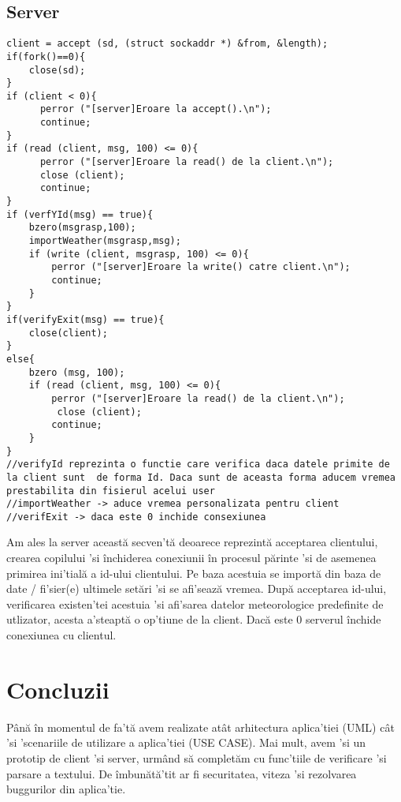 \documentclass{llncs}
\begin{document}
\subsection{Server}
%
\begin{lstlisting}
client = accept (sd, (struct sockaddr *) &from, &length);
if(fork()==0){
	close(sd);
}
if (client < 0){
	  perror ("[server]Eroare la accept().\n");
	  continue;
}
if (read (client, msg, 100) <= 0){
	  perror ("[server]Eroare la read() de la client.\n");
	  close (client);	
	  continue;		
}
if (verfYId(msg) == true){
	bzero(msgrasp,100);
	importWeather(msgrasp,msg);
	if (write (client, msgrasp, 100) <= 0){
	 	perror ("[server]Eroare la write() catre client.\n");
	  	continue;		
	}
}
if(verifyExit(msg) == true){
	close(client);
}
else{
	bzero (msg, 100);
	if (read (client, msg, 100) <= 0){
	  	perror ("[server]Eroare la read() de la client.\n");
	 	 close (client);	
	  	continue;		
	}
}
//verifyId reprezinta o functie care verifica daca datele primite de la client sunt  de forma Id. Daca sunt de aceasta forma aducem vremea prestabilita din fisierul acelui user
//importWeather -> aduce vremea personalizata pentru client
//verifExit -> daca este 0 inchide consexiunea
\end{lstlisting}
%
Am ales la server această secven'tă deoarece reprezintă acceptarea clientului, crearea copilului 'si închiderea conexiunii în procesul părinte 'si de asemenea
primirea ini'tială a id-ului clientului. Pe baza acestuia se importă din baza de date / fi'sier(e) ultimele setări 'si se afi'sează vremea. După acceptarea id-ului, verificarea existen'tei
acestuia 'si afi'sarea datelor meteorologice predefinite de utlizator, acesta a'steaptă o op'tiune de la client. Dacă este 0 serverul închide conexiunea cu clientul.
%
\section{Concluzii}
%
Până în momentul de fa'tă avem realizate atât arhitectura aplica'tiei (UML) cât 'si 'scenariile de utilizare a aplica'tiei (USE CASE). Mai mult, avem 'si un prototip de client 'si server, urmând să completăm cu func'tiile de verificare 'si parsare a textului. De îmbunătă'tit ar fi securitatea, viteza 'si rezolvarea buggurilor din aplica'tie.
%
\end{document}
